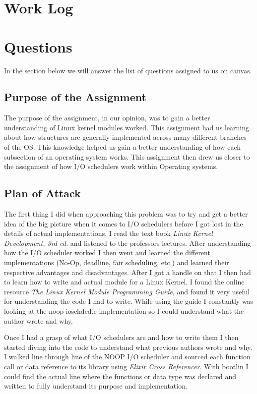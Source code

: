 \documentclass[onecolumn, draftclsnofoot,10pt, compsoc]{IEEEtran}
\begin{document}
        \section{Work Log}
            
        \section{Questions}
        
            In the section below we will answer the list of questions assigned to us on canvas.

        \subsection{Purpose of the Assignment}
            The purpose of the assignment, in our opinion, was to gain a better understanding of Linux kernel modules worked. This assignment had us learning about how structures are generally implemented across many different branches of the OS. This knowledge helped us gain a better understanding of how each subsection of an operating system works. This assignment then drew us closer to the assignment of how I/O schedulers work within Operating systems.
            
        \subsection{Plan of Attack}
            The first thing I did when approaching this problem was to try and get a better idea of the big picture when it comes to I/O schedulers before I got lost in the details of actual implementations. I read the text book \textit{Linux Kernel Development, 3rd ed.}\cite{Linux-Kernel-Development:2} and listened to the professors lectures. After understanding how the I/O scheduler worked I then went and learned the different implementations (No-Op, deadline, fair scheduling, etc.) and learned their respective advantages and disadvantages. After I got a handle on that I then had to learn how to write and actual module for a Linux Kernel. I found the online resource \textit{The Linux Kernel Module Programming Guide}\cite{tldp-web:3}, and found it very useful for understanding the code I had to write. While using the guide I constantly was looking at the noop-ioschded.c implementation so I could understand what the author wrote and why.
            
            Once I had a grasp of what I/O schedulers are and how to write them I then started diving into the code to understand what previous authors wrote and why. I walked line through line of the NOOP I/O scheduler and sourced each function call or data reference to its library using \textit{Elixir Cross Referencer}\cite{bootlin:4}. With bootlin I could find the actual line where the functions or data type was declared and written to fully understand its purpose and implementation.
            
\end{document}
